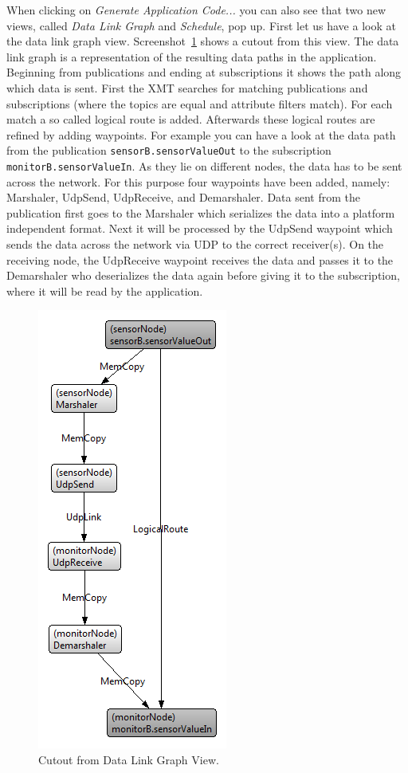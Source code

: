 When clicking on \emph{Generate Application Code...} you can also see that two new views, called \emph{Data Link Graph} and \emph{Schedule}, pop up.
First let us have a look at the data link graph view.
Screenshot~\ref{fig:xmt_dataLinkGraphView} shows a cutout from this view.
The data link graph is a representation of the resulting data paths in the application.
Beginning from publications and ending at subscriptions it shows the path along which data is sent.
First the XMT searches for matching publications and subscriptions (where the topics are equal and attribute filters match).
For each match a so called logical route is added.
Afterwards these logical routes are refined by adding waypoints.
For example you can have a look at the data path from the publication \verb|sensorB.sensorValueOut| to the subscription \verb|monitorB.sensorValueIn|.
As they lie on different nodes, the data has to be sent across the network.
For this purpose four waypoints have been added, namely: Marshaler, UdpSend, UdpReceive, and Demarshaler.
Data sent from the publication first goes to the Marshaler which serializes the data into a platform independent format.
Next it will be processed by the UdpSend waypoint which sends the data across the network via UDP to the correct receiver(s).
On the receiving node, the UdpReceive waypoint receives the data and passes it to the Demarshaler who deserializes the data again before giving it to the subscription,
where it will be read by the application.

\begin{figure}[ht]
	\centering
	\includegraphics[scale=0.75]{figures/xmt_dataLinkGraphView.png}
	\caption{Cutout from Data Link Graph View.}
	\label{fig:xmt_dataLinkGraphView}
\end{figure}

